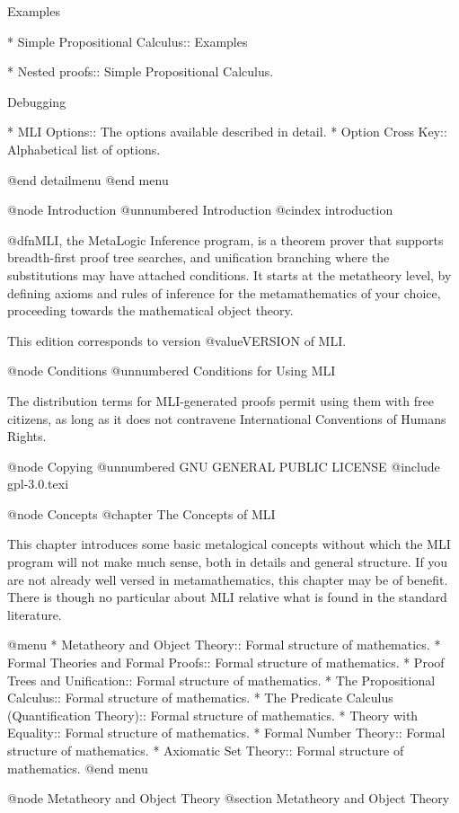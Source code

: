 Examples

* Simple Propositional Calculus:: Examples

* Nested proofs::   Simple Propositional Calculus.


Debugging

* MLI Options::       The options available described in detail.
* Option Cross Key::  Alphabetical list of options.


@end detailmenu
@end menu

@node Introduction
@unnumbered Introduction
@cindex introduction

@dfn{MLI}, the MetaLogic Inference program, is a theorem prover that supports breadth-first proof tree searches, and unification branching where the substitutions may have attached conditions. It starts at the metatheory level, by defining axioms and rules of inference for the metamathematics of your choice, proceeding towards the mathematical object theory.

This edition corresponds to version @value{VERSION} of MLI.

@node Conditions
@unnumbered Conditions for Using MLI

The distribution terms for MLI-generated proofs permit using them with free citizens,
as long as it does not contravene International Conventions of Humans Rights.

@node Copying
@unnumbered GNU GENERAL PUBLIC LICENSE
@include gpl-3.0.texi

@node Concepts
@chapter The Concepts of MLI

This chapter introduces some basic metalogical concepts without which the MLI program will not make much sense, both in details and general structure. If you are not already well versed in metamathematics, this chapter may be of benefit. There is though no particular about MLI relative what is found in the standard literature.

@menu
* Metatheory and Object Theory:: Formal structure of mathematics.
* Formal Theories and Formal Proofs:: Formal structure of mathematics.
* Proof Trees and Unification:: Formal structure of mathematics.
* The Propositional Calculus:: Formal structure of mathematics.
* The Predicate Calculus (Quantification Theory):: Formal structure of mathematics.
* Theory with Equality:: Formal structure of mathematics.
* Formal Number Theory:: Formal structure of mathematics.
* Axiomatic Set Theory:: Formal structure of mathematics.
@end menu


@node Metatheory and Object Theory
@section Metatheory and Object Theory

